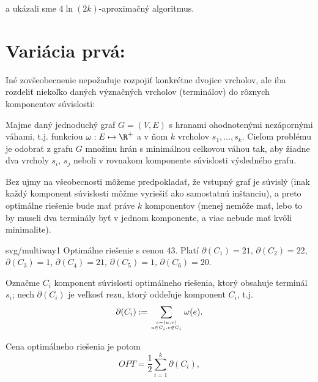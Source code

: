 a ukázali sme $4\ln(2k)$-aproximačný algoritmus. 

\section*{Variácia prvá: \multiwaycut}

Iné zovšeobecnenie nepožaduje rozpojiť konkrétne dvojice vrcholov, ale iba rozdeliť 
niekoľko daných význačných vrcholov (terminálov) do rôznych komponentov súvislosti:

\begin{framed}
  \begin{dfn}
    \label{dfn:multiwaycut}
    Majme daný jednoduchý graf $G=(V,E)$ s hranami ohodnotenými nezápornými váhami, t.j. funkciou
    $\omega:E\mapsto \R^+$ a v ňom $k$  vrcholov $s_1,\ldots,s_k$. Cieľom problému
    \multiwaycut je odobrať z grafu $G$ množinu hrán s minimálnou celkovou váhou tak, aby
    žiadne dva vrcholy $s_i$, $s_j$  neboli v rovnakom komponente súvislosti výsledného grafu.
  \end{dfn}
\end{framed}

Bez ujmy na všeobecnosti môžeme predpokladať, že vstupný graf je súvislý (inak každý komponent
súvislosti môžme vyriešiť ako samostatnú inštanciu), a preto optimálne riešenie bude mať
práve $k$ komponentov (menej nemôže mať, lebo to by museli dva terminály byť v jednom komponente,
a viac nebude mať kvôli minimalite). 

\begin{myfig}{.6\textwidth}{svg/multiway1}
    Optimálne riešenie s cenou $43$. Platí
    $\partial(C_1)=21$,
    $\partial(C_2)=22$,
    $\partial(C_3)=1$,
    $\partial(C_4)=21$,
    $\partial(C_5)=1$,
  $\partial(C_6)=20$.
\end{myfig}


Označme $C_i$ komponent súvislosti optimálneho riešenia, ktorý obsahuje terminál $s_i$; nech
$\partial(C_i)$ je veľkosť rezu, ktorý oddeľuje komponent $C_i$, t.j.
\begin{equation}
  \label{eqn:cutedgeboundary}
  \partial(C_i):=\sum_{e=(u,v)\atop u\in C_i, v\not\in C_i} \omega(e).
\end{equation}

Cena optimálneho riešenia je potom 
\begin{equation}
  \label{eqn:multiwaycut:1}
  OPT=\frac{1}{2}\sum_{i=1}^k\partial(C_i),
\end{equation}

